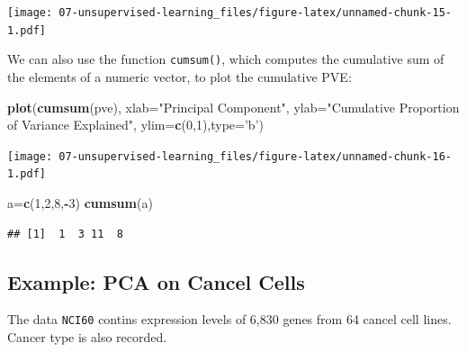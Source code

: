\documentclass[openany]{book}
\newenvironment{Shaded}{\begin{snugshade}}{\end{snugshade}}
\newcommand{\DataTypeTok}[1]{\textcolor[rgb]{0.13,0.29,0.53}{#1}}
\newcommand{\DecValTok}[1]{\textcolor[rgb]{0.00,0.00,0.81}{#1}}
\newcommand{\KeywordTok}[1]{\textcolor[rgb]{0.13,0.29,0.53}{\textbf{#1}}}
\newcommand{\NormalTok}[1]{#1}
\newcommand{\OperatorTok}[1]{\textcolor[rgb]{0.81,0.36,0.00}{\textbf{#1}}}
\newcommand{\StringTok}[1]{\textcolor[rgb]{0.31,0.60,0.02}{#1}}
\begin{document}
\texttt{[image: 07-unsupervised-learning\_files/figure-latex/unnamed-chunk-15-1.pdf]}

We can also use the function \texttt{cumsum()}, which computes the cumulative sum of the elements of a numeric vector, to plot the cumulative PVE:

\begin{Shaded}
\begin{Highlighting}[]
\KeywordTok{plot}\NormalTok{(}\KeywordTok{cumsum}\NormalTok{(pve), }\DataTypeTok{xlab=}\StringTok{"Principal Component"}\NormalTok{, }\DataTypeTok{ylab=}\StringTok{"Cumulative Proportion of Variance Explained"}\NormalTok{, }\DataTypeTok{ylim=}\KeywordTok{c}\NormalTok{(}\DecValTok{0}\NormalTok{,}\DecValTok{1}\NormalTok{),}\DataTypeTok{type=}\StringTok{'b'}\NormalTok{)}
\end{Highlighting}
\end{Shaded}

\texttt{[image: 07-unsupervised-learning\_files/figure-latex/unnamed-chunk-16-1.pdf]}

\begin{Shaded}
\begin{Highlighting}[]
\NormalTok{a=}\KeywordTok{c}\NormalTok{(}\DecValTok{1}\NormalTok{,}\DecValTok{2}\NormalTok{,}\DecValTok{8}\NormalTok{,}\OperatorTok{-}\DecValTok{3}\NormalTok{)}
\KeywordTok{cumsum}\NormalTok{(a)}
\end{Highlighting}
\end{Shaded}

\begin{verbatim}
## [1]  1  3 11  8
\end{verbatim}

\hypertarget{example-pca-on-cancel-cells}{%
\subsection{Example: PCA on Cancel Cells}\label{example-pca-on-cancel-cells}}

The data \texttt{NCI60} contins expression levels of 6,830 genes from 64 cancel cell lines. Cancer type is also recorded.

\begin{Shaded}
\end{Shaded}
\end{document}
